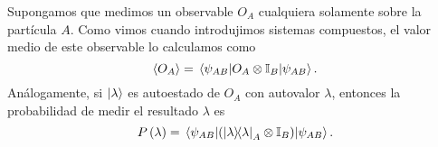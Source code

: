 \documentclass[10pt, a4paper]{article}
\numberwithin{equation}{subsection}
\begin{document}
Supongamos que medimos un observable $O_A$ cualquiera solamente sobre la
partícula $A$. Como vimos cuando introdujimos sistemas compuestos, el valor
medio de este observable lo calculamos como
\begin{equation}
  \expval{O_A} = \matrixel{\psi_{AB}}{O_A\tensor\Id_B}{\psi_{AB}}.
\end{equation}
Análogamente, si $\ket{\lambda}$ es autoestado de $O_A$ con autovalor
$\lambda$, entonces la probabilidad de medir el resultado $\lambda$ es
\begin{equation}
  \Prob{\lambda} = \matrixel{\psi_{AB}} {\left(\projector{\lambda}_A \tensor
  \Id_B\right)} {\psi_{AB}}.
\end{equation}

\end{document}
